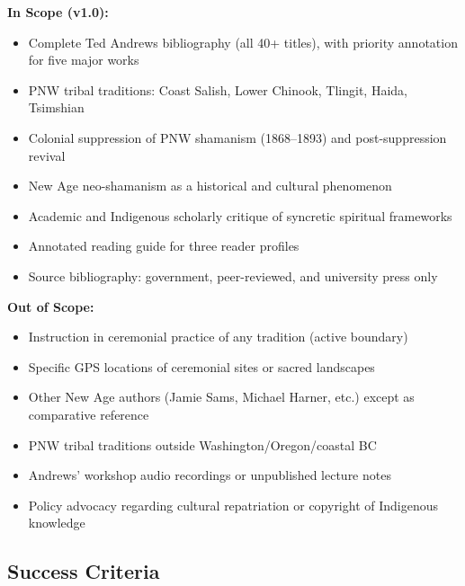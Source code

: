 \documentclass[11pt,letterpaper]{article}
\begin{document}
\textbf{In Scope (v1.0):}
\begin{itemize}[noitemsep]
  \item Complete Ted Andrews bibliography (all 40+ titles), with priority annotation for five major works
  \item PNW tribal traditions: Coast Salish, Lower Chinook, Tlingit, Haida, Tsimshian
  \item Colonial suppression of PNW shamanism (1868--1893) and post-suppression revival
  \item New Age neo-shamanism as a historical and cultural phenomenon
  \item Academic and Indigenous scholarly critique of syncretic spiritual frameworks
  \item Annotated reading guide for three reader profiles
  \item Source bibliography: government, peer-reviewed, and university press only
\end{itemize}

\textbf{Out of Scope:}
\begin{itemize}[noitemsep]
  \item Instruction in ceremonial practice of any tradition (active boundary)
  \item Specific GPS locations of ceremonial sites or sacred landscapes
  \item Other New Age authors (Jamie Sams, Michael Harner, etc.) except as comparative reference
  \item PNW tribal traditions outside Washington/Oregon/coastal BC
  \item Andrews' workshop audio recordings or unpublished lecture notes
  \item Policy advocacy regarding cultural repatriation or copyright of Indigenous knowledge
\end{itemize}

\subsection{Success Criteria}
\end{document}
